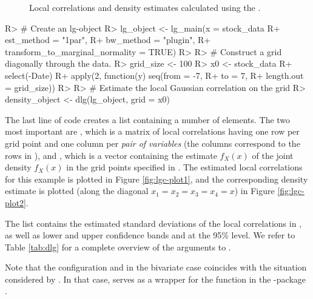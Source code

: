 \begin{figure}[t]
\begin{minipage}[t]{0.48\textwidth}
      \label{fig:lgc-plot2}
    \end{minipage}
    \caption{Local correlations and density estimates calculated using the .}
    \label{fig:lgc-plot}
  \end{figure}

\begin{example}
R> # Create an lg-object
R> lg_object <- lg_main(x = stock_data %
R+                      est_method = "1par",
R+                      bw_method = "plugin",
R+                      transform_to_marginal_normality = TRUE)
R> 
R> # Construct a grid diagonally through the data.
R> grid_size <- 100
R> x0 <- stock_data %
R+   select(-Date) %
R+   apply(2, function(y) seq(from = -7,
R+                            to = 7,
R+                            length.out = grid_size))
R> 
R> # Estimate the local Gaussian correlation on the grid
R> density_object <- dlg(lg_object, grid = x0)
\end{example}
The last line of code creates a list containing a number of elements. The two most important are , which is a matrix of local correlations having one row per grid point and one column per \emph{pair of variables} (the columns correspond to the rows in ), and , which is a vector containing the estimate \(\widehat f_X\left(x\right)\) of the joint density \(f_X\left(x\right)\) in the grid points specified in . The estimated local correlations for this example is plotted in Figure \ref{fig:lgc-plot1}, and the corresponding density estimate is plotted (along the diagonal \(x_1=x_2=x_3=x_4=x\)) in Figure \ref{fig:lgc-plot2}.

The list  contains the estimated standard deviations of the local correlations in , as well
as lower and upper confidence bands  and  at the 95\% level. We refer to Table \ref{tab:dlg} for a complete overview of the arguments to .

Note that the configuration  and  in the bivariate case coincides with the situation considered by \citet{tjos:huft:2013}. In that case,  serves as a wrapper for the function  in the -package \citep{bere:klep:tjos:2014}.

